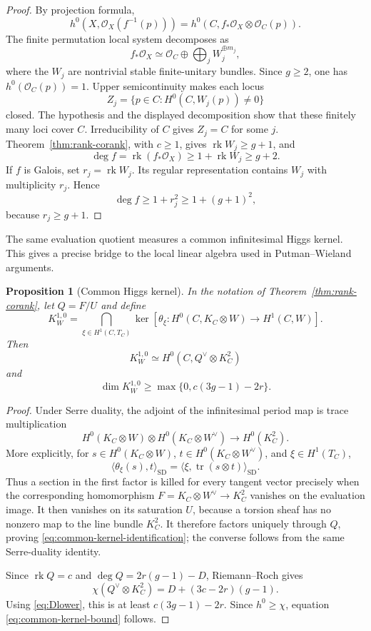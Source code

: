\documentclass[11pt,reqno]{amsart}
\numberwithin{equation}{section}
\newtheorem{proposition}[theorem]{Proposition}
\theoremstyle{definition}
\theoremstyle{remark}
\newcommand{\OO}{\mathcal O}
\newcommand{\rk}{\operatorname{rk}}
\begin{document}
\begin{proof}
By projection formula,
\[
h^0\!\left(X,\OO_X(f^{-1}(p))\right)
=h^0\!\left(C,f_*\OO_X\otimes\OO_C(p)\right).
\]
The finite permutation local system decomposes as
\[
f_*\OO_X\simeq\OO_C\oplus\bigoplus_j W_j^{\oplus m_j},
\]
where the $W_j$ are nontrivial stable finite-unitary bundles.  Since $g\ge2$, one has $h^0(\OO_C(p))=1$.  Upper semicontinuity makes each locus
\[
Z_j=\{p\in C:H^0(C,W_j(p))\ne0\}
\]
closed.  The hypothesis and the displayed decomposition show that these finitely many loci cover $C$.  Irreducibility of $C$ gives $Z_j=C$ for some $j$.  Theorem~\ref{thm:rank-corank}, with $c\ge1$, gives $\rk W_j\ge g+1$, and
\[
\deg f=\rk(f_*\OO_X)\ge1+\rk W_j\ge g+2.
\]
If $f$ is Galois, set $r_j=\rk W_j$.  Its regular representation contains $W_j$ with multiplicity $r_j$.  Hence
\[
\deg f\ge1+r_j^2\ge1+(g+1)^2,
\]
because $r_j\ge g+1$.
\end{proof}

The same evaluation quotient measures a common infinitesimal Higgs kernel.  This gives a precise bridge to the local linear algebra used in Putman--Wieland arguments.

\begin{proposition}[Common Higgs kernel]\label{prop:common-higgs}
In the notation of Theorem~\ref{thm:rank-corank}, let $Q=F/U$ and define
\[
K_W^{1,0}
=\bigcap_{\xi\in H^1(C,T_C)}
\ker\!\left[
\theta_\xi:H^0(C,K_C\otimes W)\longrightarrow H^1(C,W)
\right].
\]
Then
\begin{equation}\label{eq:common-kernel-identification}
K_W^{1,0}\simeq H^0(C,Q^\vee\otimes K_C^2)
\end{equation}
and
\begin{equation}\label{eq:common-kernel-bound}
\dim K_W^{1,0}
\ge\max\{0,c(3g-1)-2r\}.
\end{equation}
\end{proposition}

\begin{proof}
Under Serre duality, the adjoint of the infinitesimal period map is trace multiplication
\[
H^0(K_C\otimes W)\otimes H^0(K_C\otimes W^\vee)
\longrightarrow H^0(K_C^2).
\]
More explicitly, for $s\in H^0(K_C\otimes W)$, $t\in H^0(K_C\otimes W^\vee)$, and $\xi\in H^1(T_C)$,
\[
\langle\theta_\xi(s),t\rangle_{\mathrm{SD}}
=\langle\xi,\operatorname{tr}(s\otimes t)\rangle_{\mathrm{SD}}.
\]
Thus a section in the first factor is killed for every tangent vector precisely when the corresponding homomorphism
$F=K_C\otimes W^\vee\to K_C^2$ vanishes on the evaluation image.  It then vanishes on its saturation $U$, because a torsion sheaf has no nonzero map to the line bundle $K_C^2$.  It therefore factors uniquely through $Q$, proving \eqref{eq:common-kernel-identification}; the converse follows from the same Serre-duality identity.

Since $\rk Q=c$ and $\deg Q=2r(g-1)-D$, Riemann--Roch gives
\[
\chi(Q^\vee\otimes K_C^2)
=D+(3c-2r)(g-1).
\]
Using \eqref{eq:Dlower}, this is at least $c(3g-1)-2r$.  Since $h^0\ge\chi$, equation \eqref{eq:common-kernel-bound} follows.
\end{proof}
\end{document}
